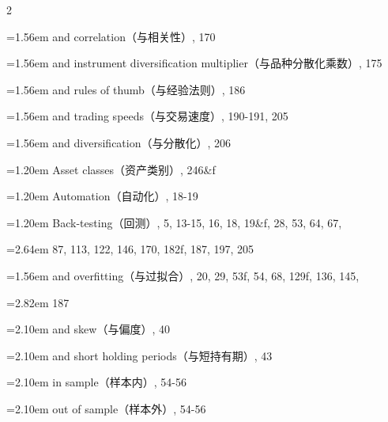 {\begin{multicols}{2}
\par \noindent\hangindent=1.56em\hspace*{0.36em} and correlation（与相关性）, 170
\par \noindent\hangindent=1.56em\hspace*{0.36em} and instrument diversification multiplier（与品种分散化乘数）, 175
\par \noindent\hangindent=1.56em\hspace*{0.36em} and rules of thumb（与经验法则）, 186
\par \noindent\hangindent=1.56em\hspace*{0.36em} and trading speeds（与交易速度）, 190-191, 205
\par \noindent\hangindent=1.56em\hspace*{0.36em} and diversification（与分散化）, 206
\par \noindent\hangindent=1.20em\hspace*{0.00em} Asset classes（资产类别）, 246\&f
\par \noindent\hangindent=1.20em\hspace*{0.00em} Automation（自动化）, 18-19
\par \noindent\hangindent=1.20em\hspace*{0.00em} Back-testing（回测）, 5, 13-15, 16, 18, 19\&f, 28, 53, 64, 67,
\par \noindent\hangindent=2.64em\hspace*{1.44em} 87, 113, 122, 146, 170, 182f, 187, 197, 205
\par \noindent\hangindent=1.56em\hspace*{0.36em} and overfitting（与过拟合）, 20, 29, 53f, 54, 68, 129f, 136, 145,
\par \noindent\hangindent=2.82em\hspace*{1.62em} 187
\par \noindent\hangindent=2.10em\hspace*{0.90em} and skew（与偏度）, 40
\par \noindent\hangindent=2.10em\hspace*{0.90em} and short holding periods（与短持有期）, 43
\par \noindent\hangindent=2.10em\hspace*{0.90em} in sample（样本内）, 54-56
\par \noindent\hangindent=2.10em\hspace*{0.90em} out of sample（样本外）, 54-56

\end{multicols}}
